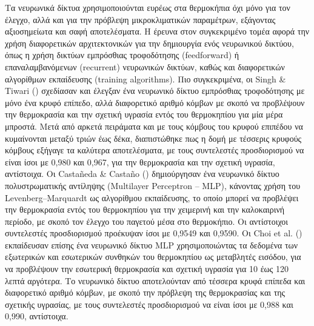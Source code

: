 \documentclass[12pt, a4paper]{report} %
\newcommand{\english}{\foreignlanguage{english}}
\begin{document}
Τα νευρωνικά δίκτυα χρησιμοποιούνται ευρέως στα θερμοκήπια όχι μόνο για τον έλεγχο, αλλά και για την πρόβλεψη 
μικροκλιματικών παραμέτρων, εξάγοντας αξιοσημείωτα και σαφή αποτελέσματα. Η έρευνα στον συγκεκριμένο τομέα αφορά την 
χρήση διαφορετικών αρχιτεκτονικών για την δημιουργία ενός νευρωνικού δικτύου, όπως η χρήση δικτύων εμπρόσθιας τροφοδότησης 
(\english{feedforward}) ή επαναλαμβανόμενων (\english{recurrent}) νευρωνικών δικτύων, καθώς και διαφορετικών αλγορίθμων 
εκπαίδευσης (\english{training algorithms}). Πιο συγκεκριμένα, οι \english{Singh \& Tiwari} (\citeyear{eisagwgi_NN_bib2}) 
σχεδίασαν και έλεγξαν ένα νευρωνικό δίκτυο εμπρόσθιας τροφοδότησης με μόνο ένα κρυφό επίπεδο, αλλά διαφορετικό αριθμό 
κόμβων με σκοπό να προβλέψουν την θερμοκρασία και την σχετική υγρασία εντός του θερμοκηπίου για μία μέρα μπροστά. Μετά 
από αρκετά πειράματα και με τους κόμβους του κρυφού επιπέδου να κυμαίνονται μεταξύ τριών έως δέκα, διαπιστώθηκε πως η δομή 
με τέσσερις κρυφούς κόμβους εξήγαγε τα καλύτερα αποτελέσματα, με τους συντελεστές προσδιορισμού να είναι ίσοι με 0,980 
και 0,967, για την θερμοκρασία και την σχετική υγρασία, αντίστοιχα. Οι \english{Castañeda \& Castaño} 
(\citeyear{neural_bib12}) δημιούργησαν ένα νευρωνικό δίκτυο πολυστρωματικής αντίληψης 
(\english{Multilayer Perceptron – MLP}), κάνοντας χρήση του \english{Levenberg–Marquardt} ως αλγορίθμου εκπαίδευσης, το 
οποίο μπορεί να προβλέψει την θερμοκρασία εντός του θερμοκηπίου για την χειμερινή και την καλοκαιρινή περίοδο, με σκοπό 
τον έλεγχο του παγετού μέσα στο θερμοκήπιο. Οι αντίστοιχοι συντελεστές προσδιορισμού προέκυψαν ίσοι με 0,9549 και 0,9590. 
Οι \english{Choi et al.} (\citeyear{neural_bib13}) εκπαίδευσαν επίσης ένα νευρωνικό δίκτυο \english{MLP} χρησιμοποιώντας 
τα δεδομένα των εξωτερικών και εσωτερικών συνθηκών του θερμοκηπίου ως μεταβλητές εισόδου, για να προβλέψουν την εσωτερική 
θερμοκρασία και σχετική υγρασία για 10 έως 120 λεπτά αργότερα. Το νευρωνικό δίκτυο αποτελούνταν από τέσσερα κρυφά επίπεδα 
και διαφορετικό αριθμό κόμβων, με σκοπό την πρόβλεψη της θερμοκρασίας και της σχετικής υγρασίας, με τους συντελεστές 
προσδιορισμού να είναι ίσοι με 0,988 και 0,990, αντίστοιχα.
\end{document}

